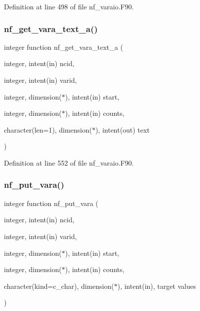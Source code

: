 Definition at line 498 of file nf\+\_\+varaio.\+F90.

\mbox{\label{nf__varaio_8F90_a65577db7879ba6687ddd5a803d0887c1}} 
\subsubsection{\texorpdfstring{nf\+\_\+get\+\_\+vara\+\_\+text\+\_\+a()}{nf\_get\_vara\_text\_a()}}
{\footnotesize\ttfamily integer function nf\+\_\+get\+\_\+vara\+\_\+text\+\_\+a (\begin{DoxyParamCaption}\item[{integer, intent(in)}]{ncid,  }\item[{integer, intent(in)}]{varid,  }\item[{integer, dimension($\ast$), intent(in)}]{start,  }\item[{integer, dimension($\ast$), intent(in)}]{counts,  }\item[{character(len=1), dimension($\ast$), intent(out)}]{text }\end{DoxyParamCaption})}



Definition at line 552 of file nf\+\_\+varaio.\+F90.

\mbox{\label{nf__varaio_8F90_abfdeb32ad7149e1e1664dd4234b780c8}} 
\subsubsection{\texorpdfstring{nf\+\_\+put\+\_\+vara()}{nf\_put\_vara()}}
{\footnotesize\ttfamily integer function nf\+\_\+put\+\_\+vara (\begin{DoxyParamCaption}\item[{integer, intent(in)}]{ncid,  }\item[{integer, intent(in)}]{varid,  }\item[{integer, dimension($\ast$), intent(in)}]{start,  }\item[{integer, dimension($\ast$), intent(in)}]{counts,  }\item[{character(kind=c\+\_\+char), dimension($\ast$), intent(in), target}]{values }\end{DoxyParamCaption})}



